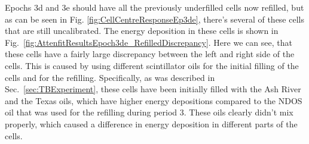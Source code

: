 Epochs 3d and 3e should have all the previously underfilled cells now refilled, but as can be seen in Fig. \ref{fig:CellCentreResponseEp3de}, there's several of these cells that are still uncalibrated. The energy deposition in these cells is shown in Fig.~\ref{fig:AttenfitResultsEpoch3de_RefilledDiscrepancy}. Here we can see, that these cells have a fairly large discrepancy between the left and right side of the cells. This is caused by using different scintillator oils for the initial filling of the cells and for the refilling. Specifically, as was described in Sec.~\ref{sec:TBExperiment}, these cells have been initially filled with the Ash River and the Texas oils, which have higher energy depositions compared to the \gls{NDOS} oil that was used for the refilling during period 3. These oils clearly didn't mix properly, which caused a difference in energy deposition in different parts of the cells.

